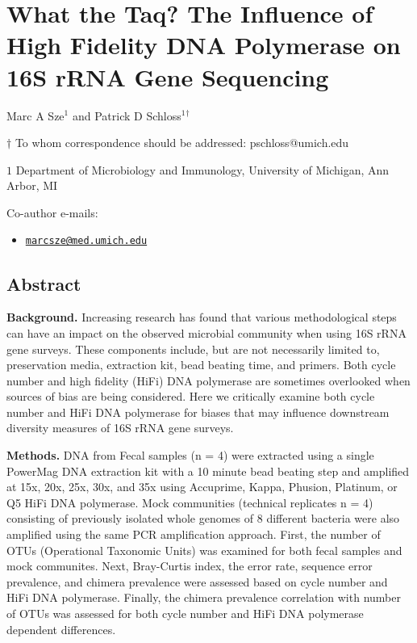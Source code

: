 \documentclass[12pt,]{article}
\title{}
\author{}
\date{}
\providecommand{\tightlist}{%
  \setlength{\itemsep}{0pt}\setlength{\parskip}{0pt}}
\begin{document}
\section{What the Taq? The Influence of High Fidelity DNA Polymerase on
16S rRNA Gene
Sequencing}\label{what-the-taq-the-influence-of-high-fidelity-dna-polymerase-on-16s-rrna-gene-sequencing}

\begin{center}
\vspace{25mm}

Marc A Sze${^1}$ and Patrick D Schloss${^1}$${^\dagger}$

\vspace{20mm}

$\dagger$ To whom correspondence should be addressed: pschloss@umich.edu

$1$ Department of Microbiology and Immunology, University of Michigan, Ann Arbor, MI




\end{center}

Co-author e-mails:

\begin{itemize}
\tightlist
\item
  \href{mailto:marcsze@med.umich.edu}{\nolinkurl{marcsze@med.umich.edu}}
\end{itemize}

\newpage

\linenumbers

\subsection{Abstract}\label{abstract}

\textbf{Background.} Increasing research has found that various
methodological steps can have an impact on the observed microbial
community when using 16S rRNA gene surveys. These components include,
but are not necessarily limited to, preservation media, extraction kit,
bead beating time, and primers. Both cycle number and high fidelity
(HiFi) DNA polymerase are sometimes overlooked when sources of bias are
being considered. Here we critically examine both cycle number and HiFi
DNA polymerase for biases that may influence downstream diversity
measures of 16S rRNA gene surveys.

\textbf{Methods.} DNA from Fecal samples (n = 4) were extracted using a
single PowerMag DNA extraction kit with a 10 minute bead beating step
and amplified at 15x, 20x, 25x, 30x, and 35x using Accuprime, Kappa,
Phusion, Platinum, or Q5 HiFi DNA polymerase. Mock communities
(technical replicates n = 4) consisting of previously isolated whole
genomes of 8 different bacteria were also amplified using the same PCR
amplification approach. First, the number of OTUs (Operational Taxonomic
Units) was examined for both fecal samples and mock communites. Next,
Bray-Curtis index, the error rate, sequence error prevalence, and
chimera prevalence were assessed based on cycle number and HiFi DNA
polymerase. Finally, the chimera prevalence correlation with number of
OTUs was assessed for both cycle number and HiFi DNA polymerase
dependent differences.
\end{document}
